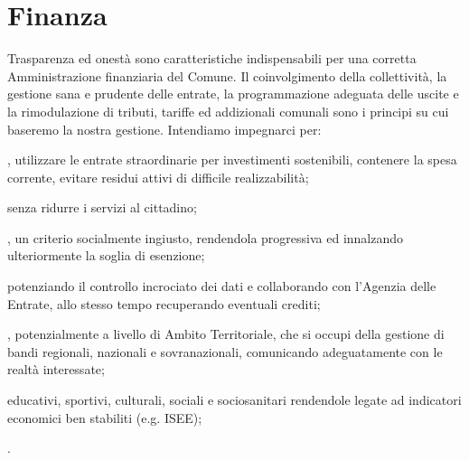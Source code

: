 \section{Finanza}
Trasparenza ed onestà sono caratteristiche indispensabili per una corretta Amministrazione finanziaria del Comune. Il coinvolgimento della collettività, la gestione sana e prudente delle entrate, la programmazione adeguata delle uscite e la rimodulazione di tributi, tariffe ed addizionali comunali sono i principi su cui baseremo la nostra gestione. Intendiamo impegnarci per:

, utilizzare le entrate straordinarie per investimenti sostenibili, contenere la spesa corrente, evitare residui attivi di difficile realizzabilità;

 senza ridurre i servizi al cittadino;

\begin{bluebox}
, un criterio socialmente ingiusto, rendendola progressiva ed innalzando ulteriormente la soglia di esenzione;
\end{bluebox}

 potenziando il controllo incrociato dei dati e collaborando con l'Agenzia delle Entrate, allo stesso tempo recuperando eventuali crediti;

, potenzialmente a livello di Ambito Territoriale, che si occupi della gestione di bandi regionali, nazionali e sovranazionali, comunicando adeguatamente  con le realtà interessate;

 educativi, sportivi, culturali, sociali e sociosanitari rendendole legate ad indicatori economici ben stabiliti (e.g. ISEE);

.
